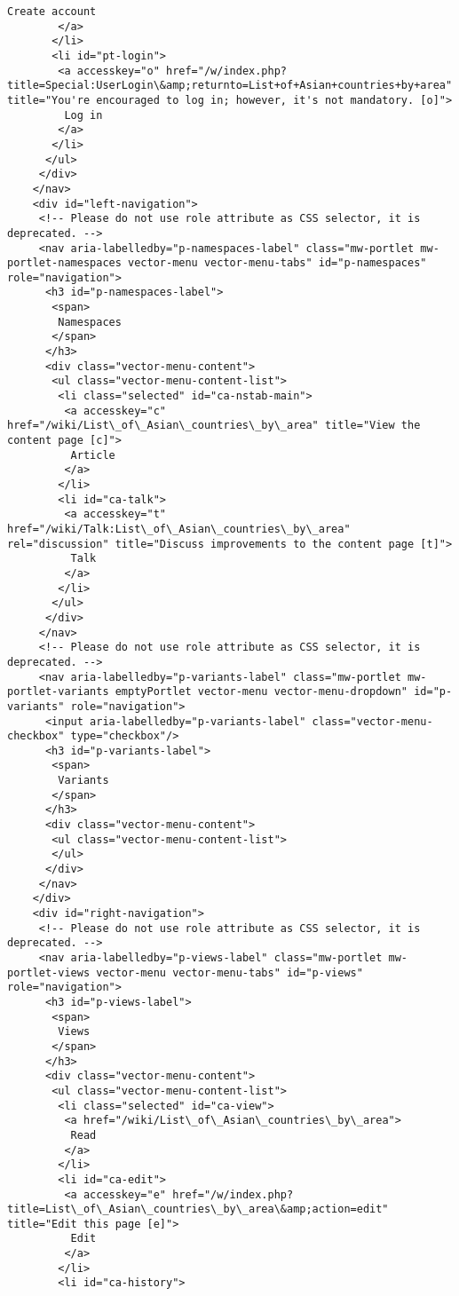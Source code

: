 \documentclass[11pt]{article}
\begin{document}
\begin{Verbatim}[commandchars=\\\{\}]
         Create account
        </a>
       </li>
       <li id="pt-login">
        <a accesskey="o" href="/w/index.php?title=Special:UserLogin\&amp;returnto=List+of+Asian+countries+by+area" title="You're encouraged to log in; however, it's not mandatory. [o]">
         Log in
        </a>
       </li>
      </ul>
     </div>
    </nav>
    <div id="left-navigation">
     <!-- Please do not use role attribute as CSS selector, it is deprecated. -->
     <nav aria-labelledby="p-namespaces-label" class="mw-portlet mw-portlet-namespaces vector-menu vector-menu-tabs" id="p-namespaces" role="navigation">
      <h3 id="p-namespaces-label">
       <span>
        Namespaces
       </span>
      </h3>
      <div class="vector-menu-content">
       <ul class="vector-menu-content-list">
        <li class="selected" id="ca-nstab-main">
         <a accesskey="c" href="/wiki/List\_of\_Asian\_countries\_by\_area" title="View the content page [c]">
          Article
         </a>
        </li>
        <li id="ca-talk">
         <a accesskey="t" href="/wiki/Talk:List\_of\_Asian\_countries\_by\_area" rel="discussion" title="Discuss improvements to the content page [t]">
          Talk
         </a>
        </li>
       </ul>
      </div>
     </nav>
     <!-- Please do not use role attribute as CSS selector, it is deprecated. -->
     <nav aria-labelledby="p-variants-label" class="mw-portlet mw-portlet-variants emptyPortlet vector-menu vector-menu-dropdown" id="p-variants" role="navigation">
      <input aria-labelledby="p-variants-label" class="vector-menu-checkbox" type="checkbox"/>
      <h3 id="p-variants-label">
       <span>
        Variants
       </span>
      </h3>
      <div class="vector-menu-content">
       <ul class="vector-menu-content-list">
       </ul>
      </div>
     </nav>
    </div>
    <div id="right-navigation">
     <!-- Please do not use role attribute as CSS selector, it is deprecated. -->
     <nav aria-labelledby="p-views-label" class="mw-portlet mw-portlet-views vector-menu vector-menu-tabs" id="p-views" role="navigation">
      <h3 id="p-views-label">
       <span>
        Views
       </span>
      </h3>
      <div class="vector-menu-content">
       <ul class="vector-menu-content-list">
        <li class="selected" id="ca-view">
         <a href="/wiki/List\_of\_Asian\_countries\_by\_area">
          Read
         </a>
        </li>
        <li id="ca-edit">
         <a accesskey="e" href="/w/index.php?title=List\_of\_Asian\_countries\_by\_area\&amp;action=edit" title="Edit this page [e]">
          Edit
         </a>
        </li>
        <li id="ca-history">

\end{Verbatim}
\end{document}

